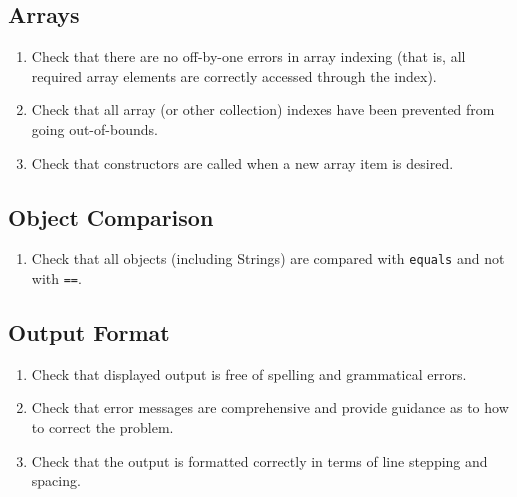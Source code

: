 \documentclass[a4paper,11pt]{report} %
\begin{document}
		\subsection*{Arrays}\begin{enumerate}[resume]
			\item Check that there are no off-by-one errors in array indexing (that is, all required array elements are correctly accessed through the index).
			\item Check that all array (or other collection) indexes have been prevented from going out-of-bounds.
			\item Check that constructors are called when a new array item is desired.
		\end{enumerate}
		
		\subsection*{Object Comparison}\begin{enumerate}[resume]
			\item Check that all objects (including Strings) are compared with \texttt{equals} and not with \texttt{==}.
		\end{enumerate}
		
		\subsection*{Output Format}\begin{enumerate}[resume]
			\item Check that displayed output is free of spelling and grammatical errors.
			\item Check that error messages are comprehensive and provide guidance as to how to correct the problem.
			\item Check that the output is formatted correctly in terms of line stepping and spacing.
		\end{enumerate}
		
\end{document}

